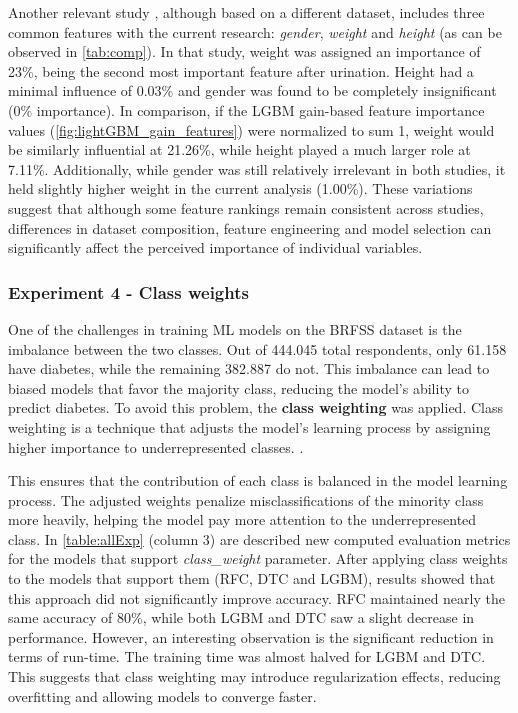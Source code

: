 \documentclass[runningheads]{llncs}
\begin{document}
Another relevant study \cite{GANIE2022100092}, although based on a different dataset, includes three common features with the current research: \textit{gender}, \textit{weight} and \textit{height} (as can be observed in \autoref{tab:comp}). 
In that study, weight was assigned an importance of 23\%, being the second most important feature after urination. Height had a minimal influence of 0.03\% and gender was found to be completely insignificant (0\% importance). 
In comparison, if the LGBM gain-based feature importance values (\autoref{fig:lightGBM_gain_features}) were normalized to sum 1,  weight would be similarly influential at 21.26\%, while height played a much larger role at 7.11\%. Additionally, while gender was still relatively irrelevant in both studies, it held slightly higher weight in the current analysis (1.00\%). These variations suggest that although some feature rankings remain consistent across studies, differences in dataset composition, feature engineering and model selection can significantly affect the perceived importance of individual variables.

\subsubsection{Experiment 4 - Class weights} 
\label{section:exp_4}
One of the challenges in training ML models on the BRFSS dataset is the imbalance between the two classes. Out of 444.045 total respondents, only 61.158 have diabetes, while the remaining 382.887 do not. This imbalance can lead to biased models that favor the majority class, reducing the model's ability to predict diabetes. To avoid this problem, the \textbf{class weighting} was applied. Class weighting is a technique that adjusts the model's learning process by assigning higher importance to underrepresented classes.
\cite{classWeights2023}. 

This ensures that the contribution of each class is balanced in the model learning process. The adjusted weights penalize misclassifications of the minority class more heavily, helping the model pay more attention to the underrepresented class. 
In \autoref{table:allExp} (column 3) are described new computed evaluation metrics for the models that support \textit{class\_weight} parameter. 
After applying class weights to the models that support them (RFC, DTC and LGBM), results showed that this approach did not significantly improve accuracy. RFC maintained nearly the same accuracy of 80\%, while both LGBM and DTC saw a slight decrease in performance. However, an interesting observation is the significant reduction in terms of run-time. The training time was almost halved for LGBM and DTC. This suggests that class weighting may introduce regularization effects, reducing overfitting and allowing models to converge faster.
\end{document}
